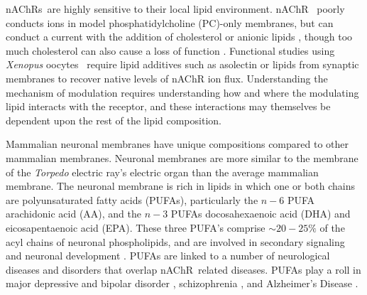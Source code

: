 \documentclass[%
 aip,
 amsmath,amssymb,
 preprint,%
]{revtex4-1}\usepackage{setspace}
\newcommand{\liam}[1]{\textcolor{black}{#1}}
\newcommand{\grace}[1]{\textcolor{black}{{#1}}}
\newcommand{\nachr}{nAChR}
\newcommand{\plgic}{pLGIC}
\newcommand{\xo}{\textit{Xenopus} oocytes}
\begin{document}
\nachr s~are highly sensitive to their local lipid environment. \nachr~ poorly conducts ions in model phosphatidylcholine (PC)-only membranes, but can conduct a current with the addition of cholesterol or anionic lipids \cite{Baenziger2017,Dalziel1980,Ellena1983,Criado1983,Fong1986,Fong1987,Jones1988,Sunshine1994,DaCosta2009b,Baenziger2017}, though too much  cholesterol can also cause a loss of function \cite{Criado1983,Mantipragada2003,Barrantes2010a,Baier2011a}. %
Functional studies using \xo~ \cite{Zhou2003,Gamba2005,Chen2015,Kouvatsos2016,Nys2016,Polovinkin2018,Moffett2019,Kumar2020} require lipid additives such as asolectin\cite{Criado1983,Zhou2003,Gamba2005,Chen2015,Nys2016,Polovinkin2018,Moffett2019,Kumar2020} or lipids from synaptic membranes \cite{Conti2013} to recover native levels of \nachr{} ion flux.  %
Understanding the mechanism of modulation requires understanding how and where the modulating lipid interacts with the receptor, and these interactions may themselves be dependent upon the rest of the lipid composition.  

Mammalian neuronal membranes \cite{Isolated1969, Taguchi2010, Breckenridge1973,Ingolfsson2017b} have unique compositions compared to other mammalian membranes\cite{McEvoy2000,Kim2001,VanMeer2010,Lorent2020,Ingolfsson2014}. Neuronal membranes are more similar to the membrane of the \textit{Torpedo} electric ray's electric organ \cite{Barrantes1989,Quesada2016} than the average mammalian membrane\cite{Ingolfsson2014}. The neuronal membrane \cite{Isolated1969, Taguchi2010, Breckenridge1973,Ingolfsson2017b} is rich in lipids in which one or both chains are polyunsaturated fatty acids (PUFAs), particularly the $n-6$ PUFA arachidonic acid (AA), and the $n-3$ PUFAs docosahexaenoic acid (DHA) and eicosapentaenoic acid (EPA). These three PUFA's comprise $\sim20-25\%$ of the acyl chains of neuronal phospholipids, and are involved in secondary signaling \cite{McNamara2006,McNamara2008} and neuronal development \cite{Maekawa2017}. PUFAs are linked to a number of neurological diseases and disorders that overlap \nachr~related diseases. PUFAs play a roll in major depressive and bipolar disorder \cite{MuralikrishnaAdibhatla,McNamara2008,Schneider2017,Koga2019,Hamazaki2015}, schizophrenia \cite{Peet2003,Bushe2005,Berger2006,Schneider2017,Maekawa2017,Hamazaki2015}, and Alzheimer's Disease \cite{Conquer2000,DiPaolo2011,Bennett2013,MuralikrishnaAdibhatla,Yadav2014a,Escriba2017}. %
\end{document}
